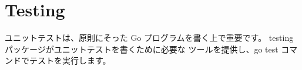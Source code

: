 \section{Testing}

ユニットテストは、原則にそった Go プログラムを書く上で重要です。 testing パッケージがユニットテストを書くために必要な ツールを提供し、go test コマンドでテストを実行します。





